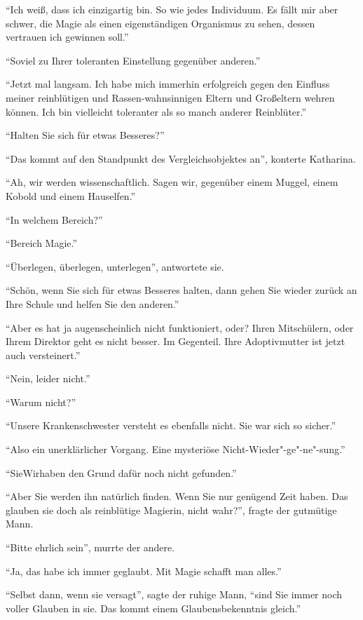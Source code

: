 \enquote{Ich weiß, dass ich einzigartig bin. So wie jedes Individuum. Es fällt mir aber schwer, die Magie als einen eigenständigen Organismus zu sehen, dessen vertrauen ich gewinnen soll.}

\enquote{Soviel zu Ihrer toleranten Einstellung gegenüber anderen.}

\enquote{Jetzt mal langsam. Ich habe mich immerhin erfolgreich gegen den Einfluss meiner reinblütigen und Rassen-wahnsinnigen Eltern und Großeltern wehren können. Ich bin vielleicht toleranter als so manch anderer Reinblüter.}

\enquote{Halten Sie sich für etwas Besseres?}

\enquote{Das kommt auf den Standpunkt des Vergleichsobjektes an}, konterte Katharina.

\enquote{Ah, wir werden wissenschaftlich. Sagen wir, gegenüber einem Muggel, einem Kobold und einem Hauselfen.}

\enquote{In welchem Bereich?}

\enquote{Bereich Magie.}

\enquote{Überlegen, überlegen, unterlegen}, antwortete sie.

\enquote{Schön, wenn Sie sich für etwas Besseres halten, dann gehen Sie wieder zurück an Ihre Schule und helfen Sie den anderen.}

\enquote{Aber es hat ja augenscheinlich nicht funktioniert, oder? Ihren Mitschülern, oder Ihrem Direktor geht es nicht besser. Im Gegenteil. Ihre Adoptivmutter ist jetzt auch versteinert.}

\enquote{Nein, leider nicht.}

\enquote{Warum nicht?}

\enquote{Unsere Krankenschwester versteht es ebenfalls nicht. Sie war sich so sicher.}

\enquote{Also ein unerklärlicher Vorgang. Eine mysteriöse Nicht-Wieder"-ge"-ne"-sung.}

\enquote{Sie\abs Wir\abs haben den Grund dafür noch nicht gefunden.}

\enquote{Aber Sie werden ihn natürlich finden. Wenn Sie nur genügend Zeit haben. Das glauben sie doch als reinblütige Magierin, nicht wahr?}, fragte der gutmütige Mann.

\enquote{Bitte ehrlich sein}, murrte der andere.

\enquote{Ja, das habe ich immer geglaubt. Mit Magie schafft man alles.}

\enquote{Selbst dann, wenn sie versagt}, sagte der ruhige Mann, \enquote{sind Sie immer noch voller Glauben in sie. Das kommt einem Glaubensbekenntnis gleich.}

